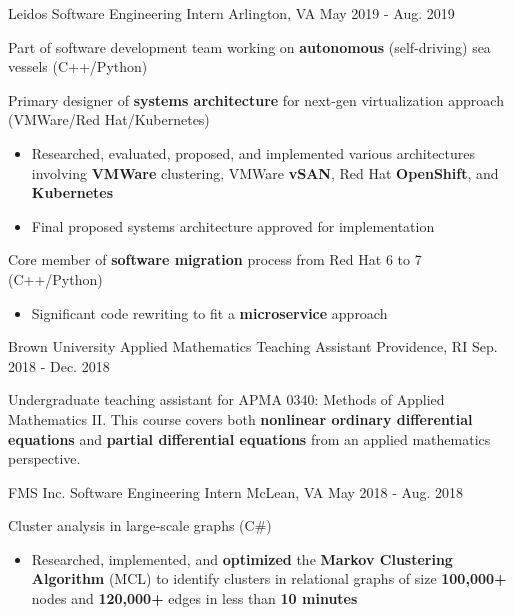 \begin{cventries}
    \cventry
    {Leidos}
    {Software Engineering Intern}
    {Arlington, VA}
    {May 2019 - Aug. 2019}
    {
        \begin{cvitems}
        \item{Part of software development team working on \textbf{autonomous} (self-driving) sea vessels (C++/Python)}
        \item{Primary designer of \textbf{systems architecture} for next-gen virtualization approach (VMWare/Red Hat/Kubernetes)}
            \begin{itemize}
                \item{Researched, evaluated, proposed, and implemented various architectures involving \textbf{VMWare} clustering, VMWare \textbf{vSAN}, Red Hat \textbf{OpenShift}, and \textbf{Kubernetes}}
                \item{Final proposed systems architecture approved for implementation}
            \end{itemize}
        \item{Core member of \textbf{software migration} process from Red Hat 6 to 7 (C++/Python)}
            \begin{itemize}
                \item{Significant code rewriting to fit a \textbf{microservice} approach}
            \end{itemize}
        \end{cvitems}
    }
    \cventry
	{Brown University}
	{Applied Mathematics Teaching Assistant}
	{Providence, RI}
	{Sep. 2018 - Dec. 2018}
    {
        \begin{cvitems}
		\item{Undergraduate teaching assistant for APMA 0340: Methods of Applied Mathematics II. This course covers both \textbf{nonlinear ordinary differential equations} and \textbf{partial differential equations} from an applied mathematics perspective.}
        \end{cvitems}
    }
    \cventry
	{FMS Inc.}
    {Software Engineering Intern}
    {McLean, VA}
    {May 2018 - Aug. 2018}
    {
        \begin{cvitems}
		\item{Cluster analysis in large-scale graphs (C\#)}
			\begin{itemize}
				\item{Researched, implemented, and \textbf{optimized} the \textbf{Markov Clustering Algorithm} (MCL) to identify clusters in relational graphs of size \textbf{100,000+} nodes and \textbf{120,000+} edges in less than \textbf{10 minutes}}

\end{itemize}
\end{cvitems}}
\end{cventries}
